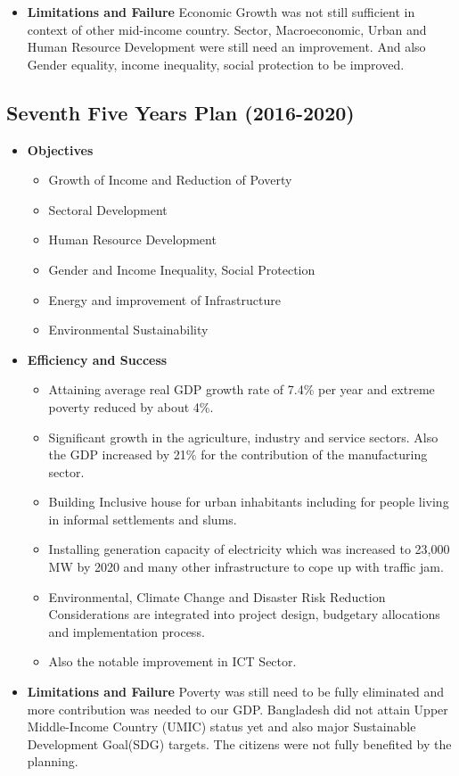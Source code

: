 \begin{itemize}
	\item\textbf{Limitations and Failure}
	Economic Growth was not still sufficient in context of other mid-income country. Sector, Macroeconomic, 
	Urban and Human Resource Development were still need an improvement. And also Gender equality, 
	income inequality, social protection to be improved.
\end{itemize}

\vspace{0.2cm}

\subsection{Seventh Five Years Plan (2016-2020)}

\begin{itemize}
	\item\textbf{Objectives}
	\begin{itemize}
		\item Growth of Income and Reduction of Poverty
		\item Sectoral Development
		\item Human Resource Development
		\item Gender and Income Inequality, Social Protection
		\item Energy and improvement of Infrastructure
		\item Environmental Sustainability
	\end{itemize}		
	
	\item\textbf{Efficiency and Success}
	\begin{itemize}
		\item Attaining average real GDP growth rate of 7.4\% per year and extreme poverty reduced by about 4\%.
		\item Significant growth in the agriculture, industry and service sectors. Also the GDP increased by 21\% 
		for the contribution of the manufacturing sector.
		\item Building Inclusive house for urban inhabitants including for people living in informal settlements and slums.
		\item Installing generation capacity of electricity which was increased to 23,000 MW by 2020 and many other 
		infrastructure to cope up with traffic jam.
		\item Environmental, Climate Change and Disaster Risk Reduction Considerations are integrated into project design, 
		budgetary allocations and implementation process.
		\item Also the notable improvement in ICT Sector.
	\end{itemize}
	
	\item\textbf{Limitations and Failure}
	Poverty was still need to be fully eliminated and more contribution was needed to our GDP. 
	Bangladesh did not attain Upper Middle-Income Country (UMIC) status yet and also major 
	Sustainable Development Goal(SDG) targets. The citizens were not fully benefited by the planning.
\end{itemize}


